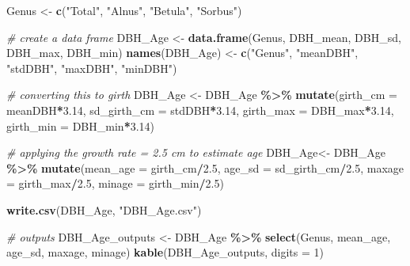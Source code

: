 \documentclass[
]{article}
\newenvironment{Shaded}{\begin{snugshade}}{\end{snugshade}}
\newcommand{\AttributeTok}[1]{\textcolor[rgb]{0.13,0.29,0.53}{#1}}
\newcommand{\CommentTok}[1]{\textcolor[rgb]{0.56,0.35,0.01}{\textit{#1}}}
\newcommand{\DecValTok}[1]{\textcolor[rgb]{0.00,0.00,0.81}{#1}}
\newcommand{\FloatTok}[1]{\textcolor[rgb]{0.00,0.00,0.81}{#1}}
\newcommand{\FunctionTok}[1]{\textcolor[rgb]{0.13,0.29,0.53}{\textbf{#1}}}
\newcommand{\NormalTok}[1]{#1}
\newcommand{\OtherTok}[1]{\textcolor[rgb]{0.56,0.35,0.01}{#1}}
\newcommand{\SpecialCharTok}[1]{\textcolor[rgb]{0.81,0.36,0.00}{\textbf{#1}}}
\newcommand{\StringTok}[1]{\textcolor[rgb]{0.31,0.60,0.02}{#1}}
\begin{document}
\begin{Shaded}
\begin{Highlighting}[]
\NormalTok{Genus }\OtherTok{\textless{}{-}} \FunctionTok{c}\NormalTok{(}\StringTok{"Total"}\NormalTok{, }\StringTok{"Alnus"}\NormalTok{, }\StringTok{"Betula"}\NormalTok{, }\StringTok{"Sorbus"}\NormalTok{)}

\CommentTok{\# create a data frame }
\NormalTok{DBH\_Age }\OtherTok{\textless{}{-}} \FunctionTok{data.frame}\NormalTok{(Genus, DBH\_mean, DBH\_sd, DBH\_max, DBH\_min) }
\FunctionTok{names}\NormalTok{(DBH\_Age) }\OtherTok{\textless{}{-}} \FunctionTok{c}\NormalTok{(}\StringTok{"Genus"}\NormalTok{, }\StringTok{"meanDBH"}\NormalTok{, }\StringTok{"stdDBH"}\NormalTok{, }\StringTok{"maxDBH"}\NormalTok{, }\StringTok{"minDBH"}\NormalTok{)}

\CommentTok{\# converting this to girth}
\NormalTok{DBH\_Age }\OtherTok{\textless{}{-}}\NormalTok{ DBH\_Age }\SpecialCharTok{\%\textgreater{}\%} 
  \FunctionTok{mutate}\NormalTok{(}\AttributeTok{girth\_cm =}\NormalTok{ meanDBH}\SpecialCharTok{*}\FloatTok{3.14}\NormalTok{, }
         \AttributeTok{sd\_girth\_cm =}\NormalTok{ stdDBH}\SpecialCharTok{*}\FloatTok{3.14}\NormalTok{, }
         \AttributeTok{girth\_max =}\NormalTok{ DBH\_max}\SpecialCharTok{*}\FloatTok{3.14}\NormalTok{, }
         \AttributeTok{girth\_min =}\NormalTok{ DBH\_min}\SpecialCharTok{*}\FloatTok{3.14}\NormalTok{)}

\CommentTok{\# applying the growth rate = 2.5 cm to estimate age}
\NormalTok{DBH\_Age}\OtherTok{\textless{}{-}}\NormalTok{ DBH\_Age }\SpecialCharTok{\%\textgreater{}\%} 
  \FunctionTok{mutate}\NormalTok{(}\AttributeTok{mean\_age =}\NormalTok{ girth\_cm}\SpecialCharTok{/}\FloatTok{2.5}\NormalTok{, }
         \AttributeTok{age\_sd =}\NormalTok{ sd\_girth\_cm}\SpecialCharTok{/}\FloatTok{2.5}\NormalTok{, }
         \AttributeTok{maxage =}\NormalTok{ girth\_max}\SpecialCharTok{/}\FloatTok{2.5}\NormalTok{, }
         \AttributeTok{minage =}\NormalTok{ girth\_min}\SpecialCharTok{/}\FloatTok{2.5}\NormalTok{)}

\FunctionTok{write.csv}\NormalTok{(DBH\_Age, }\StringTok{"DBH\_Age.csv"}\NormalTok{)}

\CommentTok{\# outputs }
\NormalTok{DBH\_Age\_outputs }\OtherTok{\textless{}{-}}\NormalTok{ DBH\_Age }\SpecialCharTok{\%\textgreater{}\%}
  \FunctionTok{select}\NormalTok{(Genus, mean\_age, age\_sd, maxage, minage)}
\FunctionTok{kable}\NormalTok{(DBH\_Age\_outputs, }\AttributeTok{digits =} \DecValTok{1}\NormalTok{)}
\end{Highlighting}
\end{Shaded}
\end{document}
